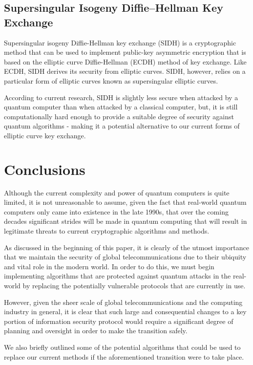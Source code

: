 \documentclass[journal]{IEEEtran}
\begin{document}
\subsection{Supersingular Isogeny Diffie–Hellman Key Exchange}

Supersingular isogeny Diffie-Hellman key exchange (SIDH) is a cryptographic method that can be used to implement public-key asymmetric encryption that is based on the elliptic curve Diffie-Hellman (ECDH) method of key exchange. Like ECDH, SIDH derives its security from elliptic curves. SIDH, however, relies on a particular form of elliptic curves known as supersingular elliptic curves.

According to current research, SIDH is slightly less secure when attacked by a quantum computer than when attacked by a classical computer, but, it is still computationally hard enough to provide a suitable degree of security against quantum algorithms - making it a potential alternative to our current forms of elliptic curve key exchange.

\section{Conclusions}

Although the current complexity and power of quantum computers is quite limited, it is not unreasonable to assume, given the fact that real-world quantum computers only came into existence in the late 1990s, that over the coming decades significant strides will be made in quantum computing that will result in legitimate threats to current cryptographic algorithms and methods.

As discussed in the beginning of this paper, it is clearly of the utmost importance that we maintain the security of global telecommunications due to their ubiquity and vital role in the modern world. In order to do this, we must begin implementing algorithms that are protected against quantum attacks in the real-world by replacing the potentially vulnerable protocols that are currently in use.

However, given the sheer scale of global telecommunications and the computing industry in general, it is clear that such large and consequential changes to a key portion of information security protocol would require a significant degree of planning and oversight in order to make the transition safely.

We also briefly outlined some of the potential algorithms that could be used to replace our current methods if the aforementioned transition were to take place.
\end{document}
